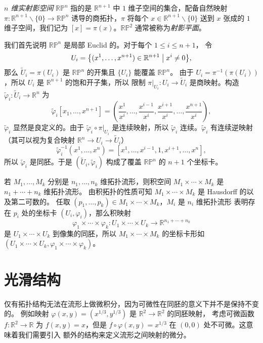 \documentclass[fontset=none]{Notes}
\begin{document}
\begin{example}[射影空间]
  \emph{$n$ 维实射影空间} $\mathbb{RP}^n$ 指的是 $\mathbb{R}^{n+1}$
  中 $1$ 维子空间的集合，配备自然映射 $\pi:\mathbb{R}^{n+1}\smallsetminus\{0\}\to\mathbb{RP}^n$
  诱导的商拓扑，$\pi$ 将每个 $x\in\mathbb{R}^{n+1}\smallsetminus\{0\}$ 送到
  $x$ 张成的 $1$ 维子空间，我们记为 $[x]=\pi(x)$。$\mathbb{RP}^2$ 通常被称为\emph{射影平面}。

  我们首先说明 $\mathbb{RP}^n$ 是局部 Euclid 的。对于每个 $1\leq i\le n+1$，
  令
  \[
    U_i=\bigl\{(x^1,\dots,x^{n+1})\in\mathbb{R}^{n+1}\bigm| x^i\neq 0\bigr\}  ,
  \]
  那么 $\tilde{U}_i=\pi(U_i)$ 是 $\mathbb{RP}^n$ 的开集且 $\{U_i\}$ 能覆盖 $\mathbb{RP}^n$。
  由于 $U_i=\pi^{-1}(\pi(U_i))$，所以 $U_i$ 是 $\mathbb{R}^{n+1}$ 的饱和开子集，所以
  限制 $\pi|_{U_i}:U_i\to \tilde{U}_i$ 是商映射。构造 $\tilde\varphi_i:\tilde U_i\to\mathbb{R}^n$
  为
  \[
    \tilde\varphi_i[x_1,\dots,x^{n+1}]=\left(\frac{x^1}{x^i},\dots,\frac{x^{i-1}}{x^i},\frac{x^{i+1}}{x^i},\dots,\frac{x^{n+1}}{x^i}\right)  ,
  \]
  $\tilde\varphi_i$ 显然是良定义的。由于 $\tilde\varphi_i\circ\pi|_{U_i}$
  是连续映射，所以 $\tilde\varphi_i$ 连续。$\tilde\varphi_i$
  有连续逆映射（其可以视为复合映射 $\mathbb{R}^n\to U_i\to\tilde U_i$）
  \[
    \tilde\varphi_i^{-1}(x^1,\dots,x^n)=[x^1,\dots,x^{i-1},1,x^{i+1},\dots,x^n],
  \]
  所以 $\tilde\varphi_i$ 是同胚。于是 $(\tilde U_i,\tilde\varphi_i)$ 构成了覆盖 $\mathbb{RP}^n$ 的
  $n+1$ 个坐标卡。
\end{example}

\begin{example}[积流形]
  若 $M_1,\dots,M_k$ 分别是 $n_1,\dots,n_k$ 维拓扑流形，则积空间
  $M_1\times\cdots\times M_k$ 是 $n_1+\cdots+n_k$ 维拓扑流形。
  由积拓扑的性质可知 $M_1\times\cdots\times M_k$ 是 Hausdorff 的以及第二可数的。
  任取 $(p_1,\dots,p_k)\in M_1\times\cdots\times M_k$，$M_i$ 是 $n_i$ 维拓扑流形
  表明存在 $p_i$ 处的坐标卡 $(U_i,\varphi_i)$，那么积映射
  \[
    \varphi_1\times\cdots\times\varphi_k:U_1\times\cdots\times U_k\to\mathbb{R}^{n_1+\cdots+ n_k}  
  \]
  是 $U_1\times\cdots\times U_k$ 到像集的同胚，所以 $M_1\times\cdots\times M_k$
  的坐标卡形如 $(U_1\times\cdots\times U_k,\varphi_1\times\cdots\times \varphi_k)$。
\end{example}

\section{光滑结构}

仅有拓扑结构无法在流形上做微积分，因为可微性在同胚的意义下并不是保持不变的。
例如映射 $\varphi(x,y)=(x^{1/3},y^{1/3})$ 是 $\mathbb{R}^2\to\mathbb{R}^2$ 的同胚映射，
考虑可微函数 $f:\mathbb{R}^2\to\mathbb{R}$ 为 $f(x,y)=x$，但是
$f\circ\varphi(x,y)=x^{1/3}$ 在 $(0,0)$ 处不可微。这意味着我们需要引入
额外的结构来定义流形之间映射的微分。
\end{document}
